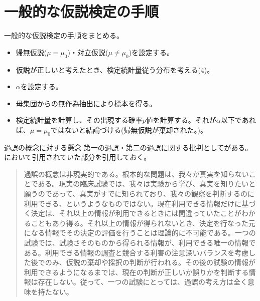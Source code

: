\section{一般的な仮説検定の手順}
一般的な仮説検定の手順をまとめる。
%
\begin{framed}
    \begin{itemize}
        \item 帰無仮説($\mu = \mu_0$)・対立仮説($\mu\neq \mu_0$)を設定する。
        \item 仮説が正しいと考えたとき、検定統計量従う分布を考える(4)。
        \item $\alpha$を設定する。
        \item 母集団からの無作為抽出により標本を得る。
        \item 検定統計量を計算し、その出現する確率$p$値を計算する。それが$\alpha$以下であれば、$\mu=\mu_0$ではないと結論づける(帰無仮説が棄却された。)。%
    \end{itemize}
\end{framed}
\fi



\begin{SMbox}{過誤の概念に対する懸念}
第一の過誤・第二の過誤に関する批判として\cite{norleans2004臨床試験のための統計的方法}がある。
\cite{2010毒性試験に用いる統計解析法の動向}において引用されていた部分を引用しておく。
\begin{quote}
過誤の概念は非現実的である。根本的な問題は、我々が真実を知らないことである。現実の臨床試験では、我々は実験から学び、真実を知りたいと願うのであって、真実がすでに知られており、我々の観察を判断するのに利用できる、というようなものではない。現在利用できる情報だけに基づく決定は、それ以上の情報が利用できるときには間違っていたことがわかることもあり得る。それ以上の情報が得られないとき、決定を行なった元になる情報でその決定の評価を行うことは理論的に不可能である。一つの試験では、試験さそのものから得られる情報が、利用できる唯一の情報である。利用できる情報の調査と競合する利害の注意深いバランスを考慮した後でのみ、仮説の棄却や採択の判断が行われる。その後の試験の情報が利用できるようになるまでは、現在の判断が正しいか誤りかを判断する情報は存在しない。従って、一つの試験にとっては、過誤の考え方は全く意味を持たない。
\end{quote}
\end{SMbox}



